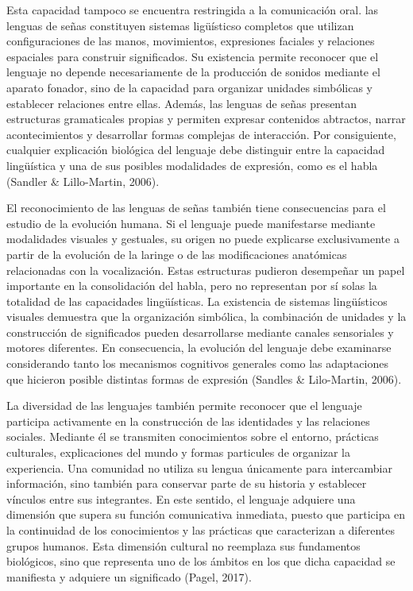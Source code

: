 \documentclass[12pt]{article}
\begin{document}
Esta capacidad tampoco se encuentra restringida a la comunicación oral. las lenguas de señas constituyen sistemas ligüísticso completos que utilizan configuraciones de las manos, movimientos, expresiones faciales y relaciones espaciales para construir significados. Su existencia permite reconocer que el lenguaje no depende necesariamente de la producción de sonidos mediante el aparato fonador, sino de la capacidad para organizar unidades simbólicas y establecer relaciones entre ellas. Además, las lenguas de señas presentan estructuras gramaticales propias y permiten expresar contenidos abtractos, narrar acontecimientos y desarrollar formas complejas de interacción. Por consiguiente, cualquier explicación biológica del lenguaje debe distinguir entre la capacidad lingüística y una de sus posibles modalidades de expresión, como es el habla (Sandler \& Lillo-Martin, 2006).

El reconocimiento de las lenguas de señas también tiene consecuencias para el estudio de la evolución humana. Si el lenguaje puede manifestarse mediante modalidades visuales y gestuales, su origen no puede explicarse exclusivamente a partir de la evolución de la laringe o de las modificaciones anatómicas relacionadas con la vocalización. Estas estructuras pudieron desempeñar un papel importante en la consolidación del habla, pero no representan por sí solas la totalidad de las capacidades lingüísticas. La existencia de sistemas lingüísticos visuales demuestra que la organización simbólica, la combinación de unidades y la construcción de significados pueden desarrollarse mediante canales sensoriales y motores diferentes. En consecuencia, la evolución del lenguaje debe examinarse considerando tanto los mecanismos cognitivos generales como las adaptaciones que hicieron posible distintas formas de expresión (Sandles \& Lilo-Martin, 2006).

La diversidad de las lenguajes también permite reconocer que el lenguaje participa activamente en la construcción de las identidades y las relaciones sociales. Mediante él se transmiten conocimientos sobre el entorno, prácticas culturales, explicaciones del mundo y formas particules de organizar la experiencia. Una comunidad no utiliza su lengua únicamente para intercambiar información, sino también para conservar parte de su historia y establecer vínculos entre sus integrantes. En este sentido, el lenguaje adquiere una dimensión que supera su función comunicativa inmediata, puesto que participa en la continuidad de los conocimientos y las prácticas que caracterizan a diferentes grupos humanos. Esta dimensión cultural no reemplaza sus fundamentos biológicos, sino que representa uno de los ámbitos en los que dicha capacidad se manifiesta y adquiere un significado (Pagel, 2017).
\end{document}
